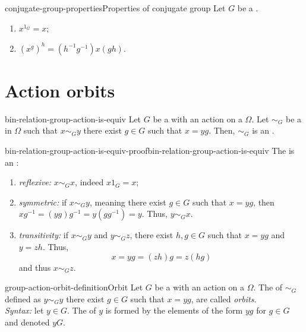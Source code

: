 \documentclass[preview]{standalone}
\begin{document}
\begin{snippetproposition}{conjugate-group-properties}{Properties of conjugate group}
    Let \(G\) be a \group.
    \begin{enumerate}
        \item \(x^{1_G} = x\);
        \item \({(x^g)}^h = (h^{-1}g^{-1})x(gh)\).
    \end{enumerate}
\end{snippetproposition}

\section{Action orbits}

\begin{snippetproposition}{bin-relation-group-action-is-equiv}{}
    Let \(G\) be a \group with an action on a \set \(\Omega\).
    Let \(\sim_G\) be a \binrelation in \(\Omega\) such that
    \(x \sim_G y\) \ifandonlyif there exist \(g\in G\)
    such that \(x=yg\). Then, \(\sim_G\) is an \equivrelation.
\end{snippetproposition}

\begin{snippetproof}{bin-relation-group-action-is-equiv-proof}{bin-relation-group-action-is-equiv}{}
    The \binrelation is an \equivrelation:
    \begin{enumerate}
        \item \emph{reflexive:} \(x \sim_G x\), indeed \(x1_G = x\);
        \item \emph{symmetric:} if \(x \sim_G y\), meaning there exist \(g\in G\)
        such that \(x=yg\), then \(xg^{-1} = (yg)g^{-1} = y(gg^{-1}) = y\).
        Thus, \(y \sim_G x\).
        \item \emph{transitivity:} if \(x \sim_G y\) and \(y\sim_G z\),
        there exist \(h,g \in G\) such that \(x=yg\) and \(y=zh\).
        Thus,
        \[
            x = yg = (zh)g = z(hg)
        \]
        and thus \(x \sim_G z\).
    \end{enumerate}
\end{snippetproof}

\begin{snippetdefinition}{group-action-orbit-definition}{Orbit}
    Let \(G\) be a \group with an action on a \set \(\Omega\).
    The  of \(\sim_G\) defined
    as \(y \sim_G y\) \ifandonlyif there exist \(g\in G\)
    such that \(x=yg\), are called \emph{orbits}. \\
    \emph{Syntax:} let \(y\in G\). The \equivclass of \(y\)
    is formed by the elements of the form \(yg\) for \(g\in G\)
    and denoted \(yG\).
\end{snippetdefinition}
\end{document}
